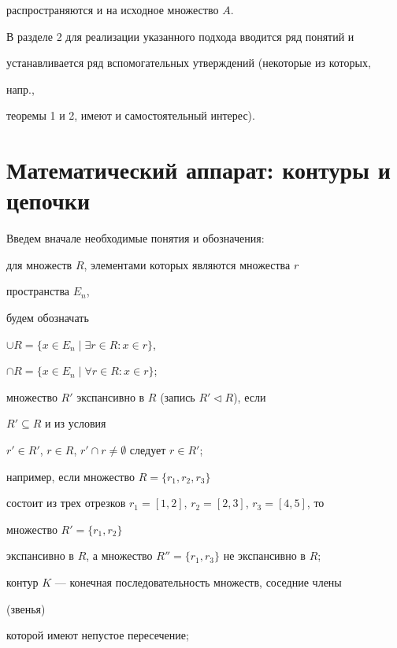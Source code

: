 распространяются и на исходное множество $A$. 


 


В разделе 2 для реализации указанного подхода вводится ряд понятий и 


устанавливается ряд вспомогательных утверждений (некоторые из которых, 


напр., 


теоремы 1 и 2, имеют и самостоятельный интерес). 


 


\section{Математический аппарат: контуры и цепочки} 


 


Введем вначале необходимые понятия и обозначения: 





для множеств $R$, элементами которых являются множества $r$ 


пространства $E_n$, 


будем обозначать 


$\cup R=\{x\in E_n\mid\exists r\in R: x\in r\}$, 


$\cap R=\{x\in E_n\mid\forall r\in R: x\in r\}$;





множество $R'$ экспансивно в $R$ (запись $R'\vartriangleleft R$), если 


$R'\subseteq R$ и из условия 


$r'\in R'$, $r\in R$, $r'\cap r\ne\emptyset$ следует $r\in R'$; 


например, если множество $R=\{r_1,r_2,r_3\}$ 


состоит из трех отрезков $r_1=[1,2]$, $r_2=[2,3]$, $r_3=[4,5]$, то 


множество $R'=\{r_1,r_2\}$ 


экспансивно в $R$, а множество $R''=\{r_1,r_3\}$ не экспансивно в $R$; 


 


контур $K$ --- конечная последовательность множеств, соседние члены 


(звенья) 


которой имеют непустое пересечение; 


